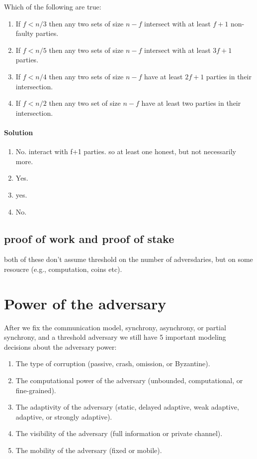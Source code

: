 \begin{xca}[Quiz 1.F]
    Which of the following are true:
    \begin{enumerate}
        \item If $f<n/3$ then any two sets of size $n-f$ intersect with at least $f+1$ non-faulty parties.
        \item If $f<n/5$ then any two sets of size $n-f$ intersect with at least $3f+1$ parties.
        \item If $f<n/4$ then any two sets of size $n-f$ have at least $2f+1$ parties in their intersection.
        \item If $f<n/2$ then any two set of size $n-f$ have at least two parties in their intersection.    
    \end{enumerate}

    \paragraph{Solution}
    \begin{enumerate}
        \item No. interact with f+1 parties. so at least one honest, but not necessarily more.
        \item Yes.
        \item yes.
        \item No.
    \end{enumerate}
\end{xca}

\subsection{proof of work and proof of stake}
both of these don't assume threshold on the number of adversdaries, but on some resoucre (e.g., computation, coins etc).
\section{Power of the adversary}
After we fix the communication model, synchrony, asynchrony, or partial synchrony, 
and a threshold adversary we still have 5 important modeling decisions about the adversary power:
\begin{enumerate}
    \item The type of corruption (passive, crash, omission, or Byzantine).
    \item The computational power of the adversary (unbounded, computational, or fine-grained).
    \item The adaptivity of the adversary (static, delayed adaptive, weak adaptive, adaptive, or strongly adaptive).
    \item The visibility of the adversary (full information or private channel).
    \item The mobility of the adversary (fixed or mobile).
\end{enumerate}


